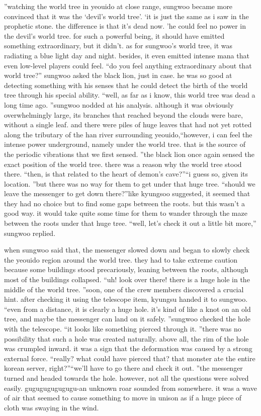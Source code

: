 ”watching the world tree in yeouido at close range, sungwoo became more convinced that it was the ‘devil’s world tree’.
‘it is just the same as i saw in the prophetic stone.
 the difference is that it’s dead now.
’he could feel no power in the devil’s world tree.
 for such a powerful being, it should have emitted something extraordinary, but it didn’t.
as for sungwoo’s world tree, it was radiating a blue light day and night.
 besides, it even emitted intense mana that even low-level players could feel.
“do you feel anything extraordinary about that world tree?” sungwoo asked the black lion, just in case.
 he was so good at detecting something with his senses that he could detect the birth of the world tree through his special ability.
“well, as far as i know, this world tree was dead a long time ago.
”sungwoo nodded at his analysis.
 although it was obviously overwhelmingly large, its branches that reached beyond the clouds were bare, without a single leaf.
 and there were piles of huge leaves that had not yet rotted along the tributary of the han river surrounding yeouido,“however, i can feel the intense power underground, namely under the world tree.
 that is the source of the periodic vibrations that we first sensed.
”the black lion once again sensed the exact position of the world tree.
 there was a reason why the world tree stood there.
“then, is that related to the heart of demon’s cave?”“i guess so, given its location.
”but there was no way for them to get under that huge tree.
“should we leave the messenger to get down there?”like kyungsoo suggested, it seemed that they had no choice but to find some gaps between the roots.
but this wasn’t a good way.
 it would take quite some time for them to wander through the maze between the roots under that huge tree.
“well, let’s check it out a little bit more,” sungwoo replied.


when sungwoo said that, the messenger slowed down and began to slowly check the yeouido region around the world tree.
they had to take extreme caution because some buildings stood precariously, leaning between the roots, although most of the buildings collapsed.
“uh! look over there! there is a huge hole in the middle of the world tree.
”soon, one of the crew members discovered a crucial hint.
 after checking it using the telescope item, kyungsu handed it to sungwoo.
“even from a distance, it is clearly a huge hole.
 it’s kind of like a knot on an old tree, and maybe the messenger can land on it safely.
”sungwoo checked the hole with the telescope.
“it looks like something pierced through it.
”there was no possibility that such a hole was created naturally.
 above all, the rim of the hole was crumpled inward.
 it was a sign that the deformation was caused by a strong external force.
“really? what could have pierced that? that monster ate the entire korean server, right?”“we’ll have to go there and check it out.
”the messenger turned and headed towards the hole.
 however, not all the questions were solved easily.
gugugugugugugu-an unknown roar sounded from somewhere.
 it was a wave of air that seemed to cause something to move in unison as if a huge piece of cloth was swaying in the wind.


 